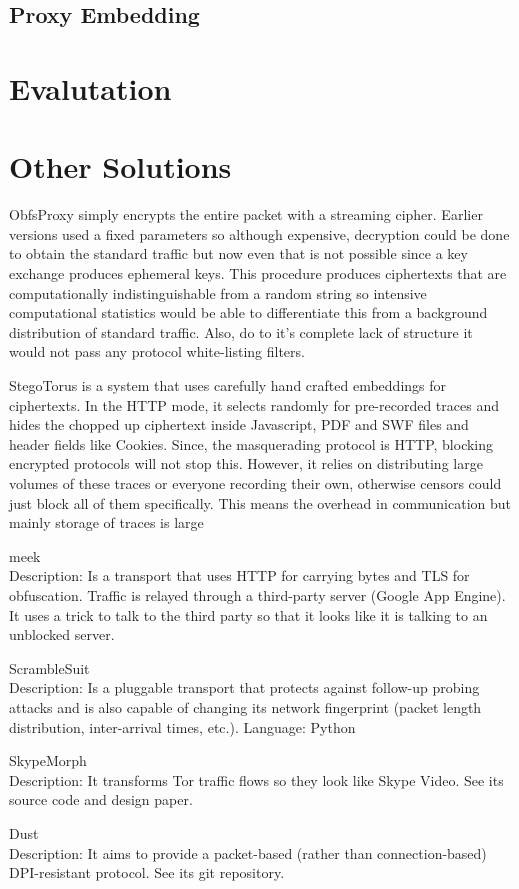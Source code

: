 \documentclass[10pt,a4paper]{article}
\begin{document}
\subsection{Proxy Embedding}

\pagebreak
\section{Evalutation}

\pagebreak
\section{Other Solutions}

ObfsProxy simply encrypts the entire packet with a streaming cipher. Earlier versions used a fixed parameters so although expensive, decryption could be done to obtain the standard traffic but now even that is not possible since a key exchange produces ephemeral keys. This procedure produces ciphertexts that are computationally indistinguishable from a random string so intensive computational statistics would be able to differentiate this from a background distribution of standard traffic. Also, do to it's complete lack of structure it would not pass any protocol white-listing filters.

StegoTorus is a system that uses carefully hand crafted embeddings for ciphertexts. In the HTTP mode, it selects randomly for pre-recorded traces and hides the chopped up ciphertext inside Javascript, PDF and SWF files and header fields like Cookies. Since, the masquerading protocol is HTTP, blocking encrypted protocols will not stop this. However, it relies on distributing large volumes of these traces or everyone recording their own, otherwise censors could just block all of them specifically. This means the overhead in communication but mainly storage of traces is large 


meek\\
Description: Is a transport that uses HTTP for carrying bytes and TLS for obfuscation. Traffic is relayed through a third-party server (Google App Engine). It uses a trick to talk to the third party so that it looks like it is talking to an unblocked server.

ScrambleSuit\\
Description: Is a pluggable transport that protects against follow-up probing attacks and is also capable of changing its network fingerprint (packet length distribution, inter-arrival times, etc.).
Language: Python

SkypeMorph\\
Description: It transforms Tor traffic flows so they look like Skype Video. See its source code and design paper.

Dust\\
Description: It aims to provide a packet-based (rather than connection-based) DPI-resistant protocol. See its git repository.


\pagebreak
\begingroup
\raggedright
{}

\endgroup
\end{document}
